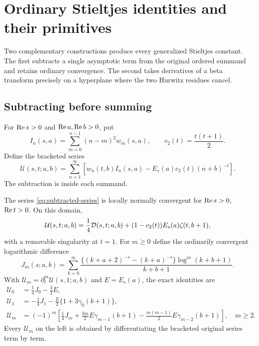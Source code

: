 \section{Ordinary Stieltjes identities and their primitives}
\label{sec:stieltjes}

Two complementary constructions produce every generalized Stieltjes
constant. The first subtracts a single asymptotic term from the original
ordered summand and retains ordinary convergence. The second takes
derivatives of a beta transform precisely on a hyperplane where the
two Hurwitz residues cancel.

\subsection{Subtracting before summing}

For $\operatorname{Re} s>0$ and $\operatorname{Re} a,\operatorname{Re} b>0$, put
\[
 I_n(s,a)=\sum_{m=0}^{n-1}(n-m)^2w_m(s,a),\qquad
 c_2(t)=\frac{t(t+1)}2.
\]
Define the bracketed series
\begin{equation}\label{eq:subtracted-series}
 \mathcal U(s,t;a,b)=
 \sum_{n=1}^{\infty}
 \left[
 w_n(t,b)I_n(s,a)-E_s(a)c_2(t)(n+b)^{-t}
 \right].
\end{equation}
The subtraction is inside each summand.

\begin{theorem}\label{thm:subtracted-jets}
The series \eqref{eq:subtracted-series} is locally normally convergent
for $\operatorname{Re} s>0$, $\operatorname{Re} t>0$. On this domain,
\begin{equation}\label{eq:subtracted-identity}
 \mathcal U(s,t;a,b)=\frac14\mathcal D(s,t;a,b)
       +(1-c_2(t))E_s(a)\zeta(t,b+1),
\end{equation}
with a removable singularity at $t=1$.
For $m\ge0$ define the ordinarily convergent logarithmic difference
\begin{equation}\label{eq:j-m}
 J_m(s;a,b)=\sum_{k=0}^{\infty}
 \frac{\{(k+a+2)^{-s}-(k+a)^{-s}\}
                 \log^m(k+b+1)}{k+b+1}.
\end{equation}
With $\mathcal U_m=\partial_t^m\mathcal U(s,1;a,b)$ and
$E=E_s(a)$, the exact identities are
\begin{align}
 \mathcal U_0&=\frac14J_0-\frac32E,\label{eq:u-zero}\\
 \mathcal U_1&=-\frac14J_1-\frac E2\{1+3\gamma_0(b+1)\},
 \label{eq:u-one}\\
 \mathcal U_m&=(-1)^m\left[
 \frac14J_m+\frac{3m}{2}E\gamma_{m-1}(b+1)
 -\frac{m(m-1)}2E\gamma_{m-2}(b+1)
 \right],\quad m\ge2.
 \label{eq:u-all}
\end{align}
Every $\mathcal U_m$ on the left is obtained by differentiating the
bracketed original series term by term.
\end{theorem}

